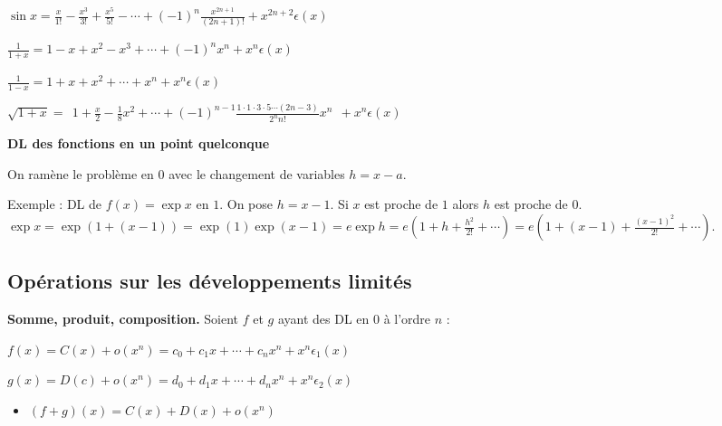 \documentclass[10pt,class=article,crop=false]{standalone}
\begin{document}
\begin{multicols}{2}
\begin{center}
\smallskip

$\sin x=\frac{x}{1!}-\frac{x^3}{3!}+\frac{x^5}{5!}-\cdots
+(-1)^n\frac{x^{2n+1}}{(2n+1)!}
+x^{2n+2}\epsilon(x)$

\smallskip





${\displaystyle \frac{1}{1+x}}=1-x+x^2-x^3+\cdots+(-1)^nx^n+x^n\epsilon(x)$

\smallskip

${\displaystyle \frac{1}{1-x}} = 1+x+x^2+\cdots+x^n+x^n\epsilon(x)$

\smallskip

$\sqrt{1+x}  =\ \ 1 + \frac{x}{2} - \frac{1}{8}x^2+ \cdots +
(-1)^{n-1} \frac{1\cdot1\cdot3\cdot5\cdots(2n-3)}{2^n n!}x^n\ \  + x^n\epsilon(x)$
\end{center}


\textbf{DL des fonctions en un point quelconque}

On ramène le problème en $0$ avec le changement de variables $h=x-a$.

Exemple : DL de $f(x)=\exp x$ en $1$.
On pose $h=x-1$. Si $x$ est proche de $1$ alors $h$ est proche de $0$.
$\exp x 
= \exp( 1+ (x-1) ) 
= \exp(1) \exp (x-1) 
= e \exp h 
= e \left(1+h+ \frac{h^2}{2!} + \cdots  \right)
= e \left(1+(x-1)+\frac{(x-1)^2}{2!}+\cdots \right)$.


\subsection{Opérations sur les développements limités}

\textbf{Somme, produit, composition.}
Soient $f$ et $g$ ayant des DL en $0$ à l'ordre $n$ :

$f(x)= C(x) + o(x^n) =c_0+c_1x + \cdots +c_nx^n + x^n\epsilon_1(x)$

$g(x)=D(c)+o(x^n)=d_0+d_1x + \cdots +d_nx^n + x^n\epsilon_2(x)$



\begin{proposition}
	\sauteligne
	\begin{itemize}
		\item $(f+g)(x)=C(x)+D(x) + o(x^n)$
		

\end{itemize}
\end{proposition}
\end{multicols}
\end{document}
